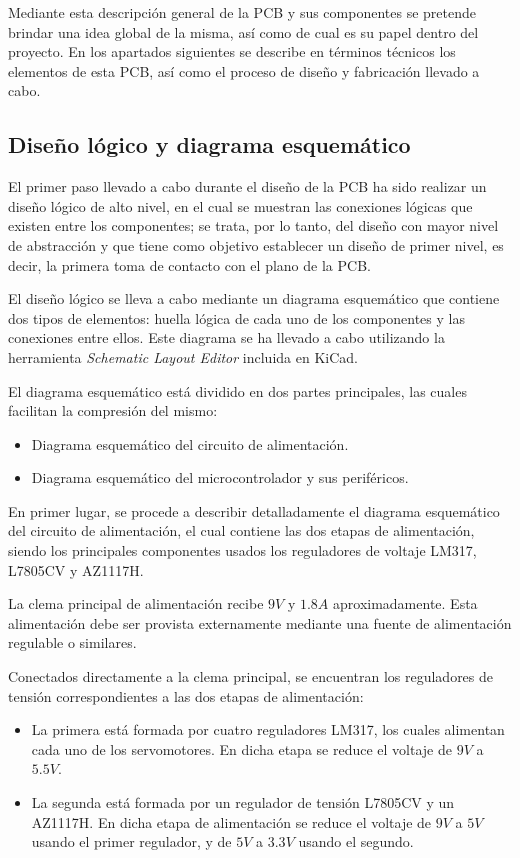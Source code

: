 Mediante esta descripción general de la \ac{PCB} y sus componentes se pretende brindar una idea global de la misma, así como de cual es su papel dentro del proyecto. En los apartados siguientes se describe en términos técnicos los elementos de esta \ac{PCB}, así como el proceso de diseño y fabricación llevado a cabo.

\subsection{Diseño lógico y diagrama esquemático}

El primer paso llevado a cabo durante el diseño de la \ac{PCB} ha sido realizar un diseño lógico de alto nivel, en el cual se muestran las conexiones lógicas que existen entre los componentes; se trata, por lo tanto, del diseño con mayor nivel de abstracción y que tiene como objetivo establecer un diseño de primer nivel, es decir, la primera toma de contacto con el plano de la \ac{PCB}.

El diseño lógico se lleva a cabo mediante un diagrama esquemático que contiene dos tipos de elementos: huella lógica de cada uno de los componentes y las conexiones entre ellos. Este diagrama se ha llevado a cabo utilizando la herramienta \textit{Schematic Layout Editor} incluida en KiCad.

El diagrama esquemático está dividido en dos partes principales, las cuales facilitan la compresión del mismo:
\begin{itemize}
    \item Diagrama esquemático del circuito de alimentación.
    \item Diagrama esquemático del microcontrolador y sus periféricos.
\end{itemize}

En primer lugar, se procede a describir detalladamente el diagrama esquemático del circuito de alimentación, el cual contiene las dos etapas de alimentación, siendo los principales componentes usados los reguladores de voltaje LM317, L7805CV y AZ1117H.

La clema principal de alimentación recibe $9V$ y $1.8A$ aproximadamente. Esta alimentación debe ser provista externamente mediante una fuente de alimentación regulable o similares. 

Conectados directamente a la clema principal, se encuentran los reguladores de tensión correspondientes a las dos etapas de alimentación:
\begin{itemize}
    \item La primera está formada por cuatro reguladores LM317, los cuales alimentan cada uno de los servomotores. En dicha etapa se reduce el voltaje de $9V$ a $5.5V$.
    
    \item La segunda está formada por un regulador de tensión L7805CV y un AZ1117H. En dicha etapa de alimentación se reduce el voltaje de $9V$ a $5V$ usando el primer regulador, y de $5V$ a $3.3V$ usando el segundo.
\end{itemize}


